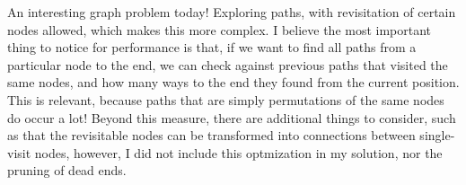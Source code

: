 An interesting graph problem today! Exploring paths, with revisitation of certain nodes allowed, which makes this more complex. I believe the most important thing to notice for performance is that, if we want to find all paths from a particular node to the end, we can check against previous paths that visited the same nodes, and how many ways to the end they found from the current position. This is relevant, because paths that are simply permutations of the same nodes do occur a lot! Beyond this measure, there are additional things to consider, such as that the revisitable nodes can be transformed into connections between single-visit nodes, however, I did not include this optmization in my solution, nor the pruning of dead ends.